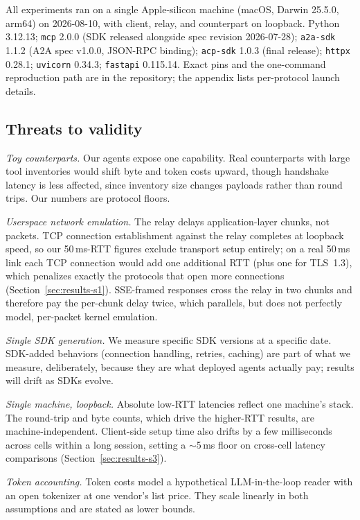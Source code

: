 \documentclass[10pt]{article}
\begin{document}
All experiments ran on a single Apple-silicon machine (macOS, Darwin
25.5.0, arm64) on 2026-08-10, with client, relay, and counterpart on
loopback. Python 3.12.13; \texttt{mcp} 2.0.0 (SDK released alongside spec
revision 2026-07-28); \texttt{a2a-sdk} 1.1.2 (A2A spec v1.0.0, JSON-RPC
binding); \texttt{acp-sdk} 1.0.3 (final release); \texttt{httpx} 0.28.1;
\texttt{uvicorn} 0.34.3; \texttt{fastapi} 0.115.14. Exact pins and the
one-command reproduction path are in the repository; the
appendix lists per-protocol launch details.

\subsection{Threats to validity}
\label{sec:validity}

\emph{Toy counterparts.} Our agents expose one capability. Real
counterparts with large tool inventories would shift byte and token costs
upward, though handshake latency is less affected, since inventory size
changes payloads rather than round trips. Our numbers are protocol
floors.
\par
\emph{Userspace network emulation.} The relay delays application-layer
chunks, not packets. TCP connection establishment against the relay
completes at loopback speed, so our 50\,ms-RTT figures exclude transport
setup entirely; on a real 50\,ms link each TCP connection would add one
additional RTT (plus one for TLS~1.3), which penalizes exactly the
protocols that open more connections (Section~\ref{sec:results-s1}).
SSE-framed responses cross the relay in two chunks and therefore pay the
per-chunk delay twice, which parallels, but does not perfectly model,
per-packet kernel emulation.
\par
\emph{Single SDK generation.} We measure specific SDK versions at a
specific date. SDK-added behaviors (connection handling, retries,
caching) are part of what we measure, deliberately, because they are what
deployed agents actually pay; results will drift as SDKs evolve.
\par
\emph{Single machine, loopback.} Absolute low-RTT latencies reflect one
machine's stack. The round-trip and byte counts, which drive the
higher-RTT results, are machine-independent. Client-side setup time also
drifts by a few milliseconds across cells within a long session, setting
a $\sim$5\,ms floor on cross-cell latency comparisons
(Section~\ref{sec:results-s3}).
\par
\emph{Token accounting.} Token costs model a hypothetical LLM-in-the-loop
reader with an open tokenizer at one vendor's list price. They scale
linearly in both assumptions and are stated as lower bounds.
\end{document}
